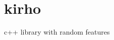 \chapter{kirho}
\hypertarget{md_README}{}\label{md_README}
\label{md_README_autotoc_md0}%
%
c++ library with random features 